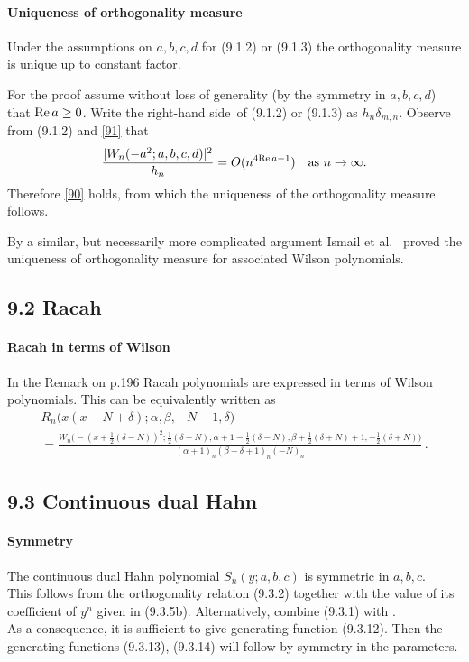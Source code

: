 \documentclass[twoside,11pt]{article}
\newcommand\al\alpha
\newcommand\be\beta
\newcommand\de\delta
\newcommand\half{\frac12}
\newcommand\thalf{\tfrac12}
\newcommand\iy\infty
\newcommand\RHS{right-hand side}
\renewcommand\Re{{\rm Re}\,}
\begin{document}
\paragraph{Uniqueness of orthogonality measure}
Under the assumptions on $a,b,c,d$ for (9.1.2) or (9.1.3) the orthogonality
measure is unique up to constant factor.

For the proof assume without
loss of generality (by the symmetry in $a,b,c,d$) that $\Re a\ge0$.
Write the \RHS\ of (9.1.2) or (9.1.3) as $h_n\de_{m,n}$.
Observe from (9.1.2) and \eqref{91} that
\[
\frac{|W_n(-a^2;a,b,c,d)|^2}{h_n} = O(n^{4\Re a-1})\quad\hbox{as $n\to\iy$.}
\]
Therefore \eqref{90} holds, from which the uniqueness of the orthogonality
measure follows.

By a similar, but necessarily more complicated argument Ismail et al.\
 proved the uniqueness of orthogonality measure for
associated Wilson polynomials.
%
\subsection*{9.2 Racah}
\label{sec9.2}
\paragraph{Racah in terms of Wilson}
In the Remark on p.196 Racah polynomials are expressed in terms of
Wilson polynomials. This can be equivalently written as
\begin{multline}
R_n\big(x(x-N+\de);\al,\be,-N-1,\de\big)\\
=\frac{W_n\big(-(x+\thalf(\de-N))^2;\thalf(\de-N),\al+1-\thalf(\de-N),
\be+\thalf(\de+N)+1,-\half(\de+N)\big)}
{(\al+1)_n (\be+\de+1)_n (-N)_n}\,.
\label{146}
\end{multline}
%
\subsection*{9.3 Continuous dual Hahn}
\label{sec9.3}
%
\paragraph{Symmetry}
The continuous dual Hahn polynomial $S_n(y;a,b,c)$ is symmetric
in $a,b,c$.\\
This follows from the orthogonality relation (9.3.2)
together with the value of its coefficient of $y^n$ given in (9.3.5b).
Alternatively, combine (9.3.1) with \mycite{AAR}{Corollary 3.3.5}.\\
As a consequence, it is sufficient to give generating function (9.3.12). Then the generating
functions (9.3.13), (9.3.14) will follow by symmetry in the parameters.
%
\end{document}
